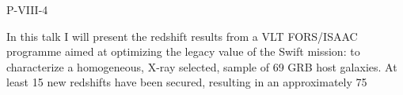 P-VIII-4


\bigskip



\bigskip

\noindent In this talk I will present the redshift results from a VLT FORS/ISAAC programme aimed at optimizing the legacy value of the Swift mission: to characterize a homogeneous, X-ray selected, sample of 69 GRB host galaxies. At least 15 new redshifts have been secured, resulting in an approximately 75%
